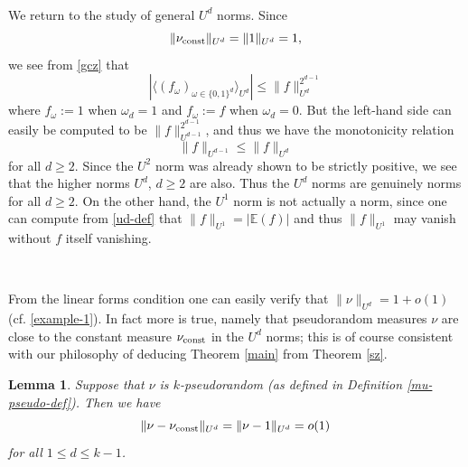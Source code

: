 \documentclass[12pt,a4paper,reqno]{amsart}
\numberwithin{equation}{section}
\theoremstyle{plain}
\newtheorem{lemma}[subsection]{Lemma}
\theoremstyle{definition}
\renewcommand{\leq}{\leqslant}
\renewcommand{\geq}{\geqslant}
\def\vconst{\ensuremath \nu_{\mbox{\scriptsize const}}}
\def\vconstlem{\ensuremath \nu_{\mbox{\scriptsize \textup{const}}}}
\def\E{{\mathbb E}}
\def\ni{\noindent}
\begin{document}
\ 

\ni We return to the study of general $U^d$ norms.  Since 
\begin{equation}\label{1-norm}
\|\vconst\|_{U^d} = \|1\|_{U^d} = 1, 
\end{equation}
we see from \eqref{gcz} that
$$  |\langle (f_\omega)_{\omega \in \{0,1\}^d} \rangle_{U^d}| \leq \|f\|_{U^d}^{2^{d-1}}$$
where $f_\omega := 1$ when $\omega_d = 1$ and $f_\omega := f$ when $\omega_d = 0$.  But the left-hand side can
easily be computed to be $\|f\|_{U^{d-1}}^{2^{d-1}}$, and thus we have the monotonicity relation
\begin{equation}\label{ud-monotone} \| f\|_{U^{d-1}} \leq \| f \|_{U^d}
\end{equation}
for all $d \geq 2$. Since the $U^2$ norm was already shown to be strictly positive, we see that the higher norms $U^d$, $d \geq 2$ are also.
Thus the $U^d$ norms are genuinely norms for all $d \geq 2$.  On the other hand, the $U^1$ norm is not actually a norm, since one can compute from \eqref{ud-def} that $\|f\|_{U^1} = |\E(f)|$ and thus $\|f\|_{U^1}$
may vanish without $f$ itself vanishing.  

\ 

\ni From the linear forms condition one can easily verify that $\| \nu\|_{U^d} = 1 + o(1)$ (cf. \eqref{example-1}).
In fact more is true, namely that pseudorandom measures $\nu$ are close to the
constant measure $\vconst$ in the $U^d$ norms; this is of course
consistent with our philosophy of deducing Theorem \ref{main} from
Theorem \ref{sz}.

\begin{lemma}\label{mua} Suppose that $\nu$ is $k$-pseudorandom \textup{(}as defined in Definition \ref{mu-pseudo-def}\textup{)}. Then we have
\begin{equation}\label{mu-uniform}
\| \nu - \vconstlem \|_{U^d} = \| \nu - 1 \|_{U^d} = o(1)
\end{equation}
for all $1 \leq d \leq k-1$.
\end{lemma}
\end{document}
